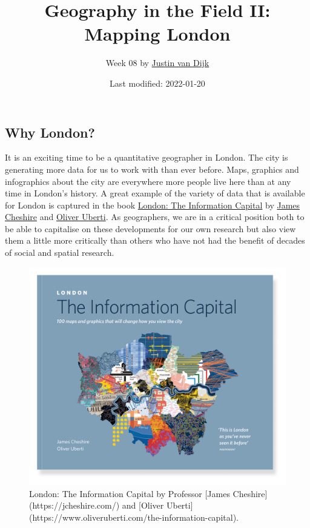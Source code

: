 \documentclass[
]{book}
\title{Geography in the Field II: Mapping London}
\author{Week 08 by \href{https://mappingdutchman.com/}{Justin van Dijk}}
\date{Last modified: 2022-01-20}
\begin{document}
\maketitle

{
\setcounter{tocdepth}{1}
\tableofcontents
}
\hypertarget{section}{%
\chapter*{}\label{section}}

\hypertarget{why-london}{%
\section*{Why London?}\label{why-london}}

It is an exciting time to be a quantitative geographer in London. The city is generating more data for us to work with than ever before. Maps, graphics and infographics about the city are everywhere more people live here than at any time in London's history. A great example of the variety of data that is available for London is captured in the book \href{https://www.oliveruberti.com/the-information-capital}{London: The Information Capital} by \href{https://jcheshire.com/}{James Cheshire} and \href{https://www.oliveruberti.com/}{Oliver Uberti}. As geographers, we are in a critical position both to be able to capitalise on these developments for our own research but also view them a little more critically than others who have not had the benefit of decades of social and spatial research.

\begin{figure}

{\centering \includegraphics[width=500pt]{images/w08/information_capital} 

}

\caption{London: The Information Capital by Professor [James Cheshire](https://jcheshire.com/) and [Oliver Uberti](https://www.oliveruberti.com/the-information-capital).}\label{fig:london-information-capital}
\end{figure}
\end{document}
